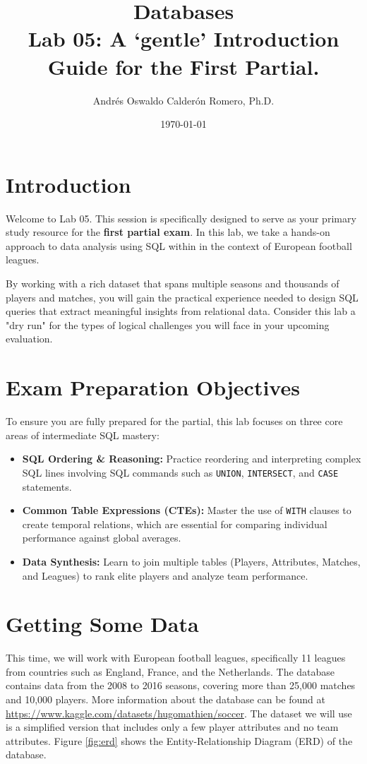 \documentclass{article}
\title{Databases \\ Lab 05: A `gentle' Introduction Guide for the First Partial.}
\author{Andrés Oswaldo Calderón Romero, Ph.D.}
\date{\today}
\begin{document}
\maketitle

\section{Introduction}
Welcome to Lab 05. This session is specifically designed to serve as your primary study resource for the \textbf{first partial exam}. In this lab, we take a hands-on approach to data analysis using SQL within in the context of European football leagues.

By working with a rich dataset that spans multiple seasons and thousands of players and matches, you will gain the practical experience needed to design SQL queries that extract meaningful insights from relational data. Consider this lab a "dry run" for the types of logical challenges you will face in your upcoming evaluation.

\section{Exam Preparation Objectives}
To ensure you are fully prepared for the partial, this lab focuses on three core areas of intermediate SQL mastery:

\begin{itemize}
    \item \textbf{SQL Ordering \& Reasoning:} Practice reordering and interpreting complex SQL lines involving SQL commands such as \texttt{UNION}, \texttt{INTERSECT}, and \texttt{CASE} statements.
    \item \textbf{Common Table Expressions (CTEs):} Master the use of \texttt{WITH} clauses to create temporal relations, which are essential for comparing individual performance against global averages.
    \item \textbf{Data Synthesis:} Learn to join multiple tables (Players, Attributes, Matches, and Leagues) to rank elite players and analyze team performance.
\end{itemize}

\section{Getting Some Data}
This time, we will work with European football leagues, specifically 11 leagues from countries such as England, France, and the Netherlands. The database contains data from the 2008 to 2016 seasons, covering more than 25,000 matches and 10,000 players.
More information about the database can be found at \url{https://www.kaggle.com/datasets/hugomathien/soccer}. The dataset we will use is a simplified version that includes only a few player attributes and no team attributes. Figure \ref{fig:erd} shows the Entity-Relationship Diagram (ERD) of the database.
\end{document}
